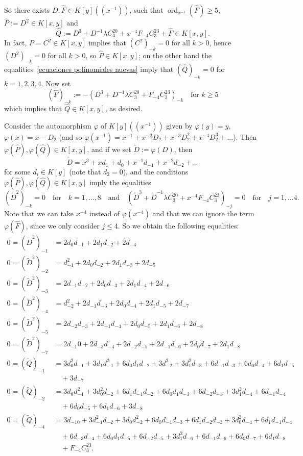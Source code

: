 \documentclass[reqno,a4paper,twoside]{amsart}
\theoremstyle{definition}
\theoremstyle{remark}
\DeclareMathOperator{\ord}{ord}
\begin{document}
So there exists $D,\hat F\in K[y]((x^{-1}))$, such that $\ord_{x^{-1}}(\hat F)\ge 5$, $\hat P:= D^2\in K[x,y]$ and
$$
\hat Q:=D^3+D^{-1}\lambda C_3^{20}+x^{-4}F_{-4}C_3^{23}+\hat F\in K[x,y].
$$
In fact, $P=C^2\in K[x,y]$ implies that $(C^2)_{-k}=0$ for all $k>0$, hence $(D^2)_{-k}=0$ for all $k>0$, so $\hat P\in K[x,y]$;
on the other hand the equalities~\eqref{ecuaciones polinomiales nuevas} imply that
$(\hat Q)_{-k}=0$ for $k=1,2,3,4$. Now set
$$
(\hat F)_{-k}:=-(D^3+D^{-1}\lambda C_3^{20}+F_{-4}C_3^{23})_{-k}\quad\text{for $k\ge 5$}
$$
which implies that $\hat Q\in K[x,y]$, as desired.

Consider the automorphism $\varphi$ of $K[y]((x^{-1}))$ given by $\varphi(y)=y$, $\varphi(x)=x-D_2$ (and so $\varphi(x^{-1})=x^{-1}+x^{-2}D_2+x^{-3}D_2^2+x^{-4}D_2^3+\dots$).
Then $\varphi(\hat P),\varphi(\hat Q)\in K[x,y]$, and if we set $\tilde D:=\varphi(D)$, then
$$
\tilde D=x^3+x d_1 +d_0+x^{-1}d_{-1}+x^{-2}d_{-2}+\dots
$$
for some $d_i\in K[y]$ (note that $d_2=0$), and the conditions $\varphi(\hat P),\varphi(\hat Q)\in K[x,y]$ imply the equalities
$$
(\tilde D^2)_{-k}=0\quad\text{for}\quad k=1,\dots,8\quad\text{and}\quad (\tilde D^3+\tilde D^{-1}\lambda C_3^{20}+x^{-4}F_{-4}C_3^{23})_{-j}=0\quad\text{for}\quad j=1,\dots 4.
$$
Note that we can take $x^{-4}$ instead of $\varphi(x^{-4})$ and that we can ignore the term $\varphi(\hat F)$, since we only consider $j\le 4$.
So we obtain the following equalities:
\begin{align*}
  0=(\tilde D^2)_{-1} & = 2 d_0 d_{-1} + 2 d_1 d_{-2} + 2 d_{-4}\\
0=(\tilde D^2)_{-2} &= d_{-1}^2 + 2 d_0 d_{-2} + 2 d_1 d_{-3} + 2 d_{-5}\\
0=(\tilde D^2)_{-3} &= 2 d_{-1} d_{-2} + 2 d_0 d_{-3} + 2 d_1 d_{-4} + 2 d_{-6}\\
0=(\tilde D^2)_{-4} &= d_{-2}^2 + 2 d_{-1} d_{-3} + 2 d_0 d_{-4} + 2 d_1 d_{-5} + 2 d_{-7}\\
0=(\tilde D^2)_{-5} &= 2 d_{-2} d_{-3} + 2 d_{-1} d_{-4} + 2 d_0 d_{-5} + 2 d_1 d_{-6} + 2 d_{-8}\\
0=(\tilde D^2)_{-7} &= 2 d_{-1}0 + 2 d_{-3} d_{-4} + 2 d_{-2} d_{-5} + 2 d_{-1} d_{-6} + 2 d_0 d_{-7} +  2 d_1 d_{-8}\\
0=(\tilde Q)_{-1}&= 3 d_0^2 d_{-1} + 3 d_1 d_{-1}^2 + 6 d_0 d_1 d_{-2} + 3 d_{-2}^2 + 3 d_1^2 d_{-3} + 6 d_{-1} d_{-3} + 6 d_0 d_{-4} + 6 d_1 d_{-5}\\
&\quad + 3 d_{-7}\\
0=(\tilde Q)_{-2}&= 3 d_0 d_{-1}^2 + 3 d_0^2 d_{-2} + 6 d_1 d_{-1} d_{-2} + 6 d_0 d_1 d_{-3} +  6 d_{-2} d_{-3} + 3 d_1^2 d_{-4} + 6 d_{-1} d_{-4}\\
&\quad + 6 d_0 d_{-5} + 6 d_1 d_{-6} +  3 d_{-8}\\
0=(\tilde Q)_{-4}&= 3 d_{-10} + 3 d_{-1}^2 d_{-2} + 3 d_0 d_{-2}^2 + 6 d_0 d_{-1} d_{-3} + 6 d_1 d_{-2} d_{-3} +  3 d_0^2 d_{-4} + 6 d_1 d_{-1} d_{-4}\\
&\quad + 6 d_{-3} d_{-4} + 6 d_0 d_1 d_{-5} + 6 d_{-2} d_{-5} +  3 d_1^2 d_{-6} + 6 d_{-1} d_{-6} + 6 d_0 d_{-7} + 6 d_1 d_{-8}\\
&\quad + F_{-4}C_3^{23}.
\end{align*}
\end{document}
